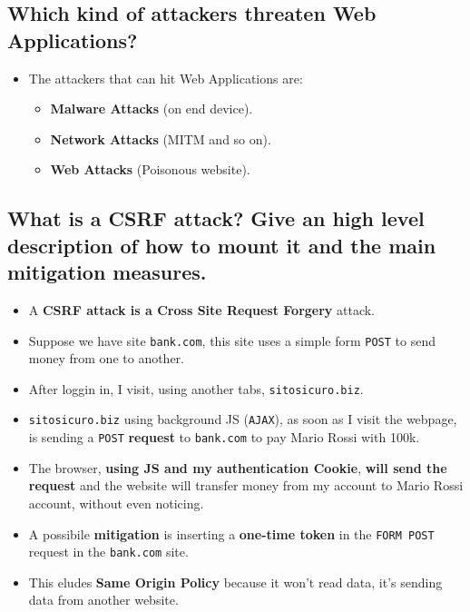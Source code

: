 \documentclass[9pt, letterpaper]{article}
\begin{document}
\subsection{Which kind of attackers threaten Web Applications?}
\begin{itemize}
	\item The attackers that can hit Web Applications are:
	\begin{itemize}
		\item \textbf{Malware Attacks} (on end device).
		\item \textbf{Network Attacks} (MITM and so on).
		\item \textbf{Web Attacks} (Poisonous website).
	\end{itemize}
\end{itemize}

\subsection{What is a CSRF attack? Give an high level description of how to mount it and the main mitigation measures.}
\begin{itemize}
	\item A \textbf{CSRF attack is a Cross Site Request Forgery} attack.
	\item Suppose we have site {\tt bank.com}, this site uses a simple form {\tt POST} to send money from one to another.
	\item After loggin in, I visit, using another tabs, {\tt sitosicuro.biz}.
	\item {\tt sitosicuro.biz} using background JS ({\tt AJAX}), as soon as I visit the webpage, is sending a {\tt POST} \textbf{request} to {\tt bank.com} to pay Mario Rossi with 100k.
	\item The browser, \textbf{using JS and my authentication Cookie}, \textbf{will send the request} and the website will transfer money from my account to Mario Rossi account, without even noticing.
	\item A possibile \textbf{mitigation} is inserting a \textbf{one-time token} in the {\tt FORM POST} request in the {\tt bank.com} site.
	\item This eludes \textbf{Same Origin Policy} because it won't read data, it's sending data from another website.
\end{itemize}
\end{document}

